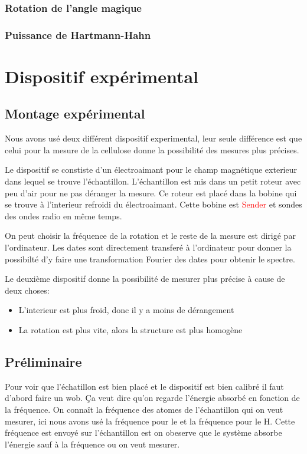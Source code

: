 \documentclass[a4paper,12pt]{scrartcl}
\begin{document}
   \subsubsection{Rotation de l'angle magique}

   \subsubsection{Puissance de Hartmann-Hahn}
 
 

 \section{Dispositif expérimental}
  \subsection{Montage expérimental}
   Nous avons usé deux différent dispositif experimental, leur seule différence est que celui pour la mesure de la cellulose donne la possibilité des mesures plus précises.

   Le dispositif se constiste d'un électroaimant pour le champ magnétique exterieur dans lequel se trouve l'échantillon. L'échantillon est mis dans un petit roteur avec peu d'air pour ne pas déranger la mesure. Ce roteur est placé dans la bobine qui se trouve à l'interieur refroidi du électroaimant. Cette bobine est \textcolor{red}{Sender} et sondes des ondes radio en même temps. 

   On peut choisir la fréquence de la rotation et le reste de la mesure est dirigé par l'ordinateur. Les dates sont directement transferé à l'ordinateur pour donner la possibilté d'y faire une transformation Fourier des dates pour obtenir le spectre.

   Le deuxième dispositif donne la possibilité de mesurer plus précise à cause de deux choses:
   \begin{itemize}
    \item L'interieur est plus froid, donc il y a moins de dérangement
    \item La rotation est plus vite, alors la structure est plus homogène
   \end{itemize}


  \subsection{Préliminaire} 
   Pour voir que l'échatillon est bien placé et le dispositif est bien calibré il faut d'abord faire un \flqq wob\frqq. \c Ca veut dire qu'on regarde l'énergie absorbé en fonction de la fréquence. On connaît la fréquence des atomes de l'échantillon qui on veut mesurer, ici nous avons usé la fréquence pour le  et la fréquence pour le H. Cette fréquence est envoyé sur l'échantillon est on obeserve que le système absorbe l'énergie sauf à la fréquence ou on veut mesurer. 
\end{document}
